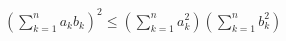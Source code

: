 $\left( \sum_{k=1}^n a_k b_k \right)^{\!\!2} \leq  \left( \sum_{k=1}^n a_k^2 \right)  \left( \sum_{k=1}^n b_k^2 \right)$